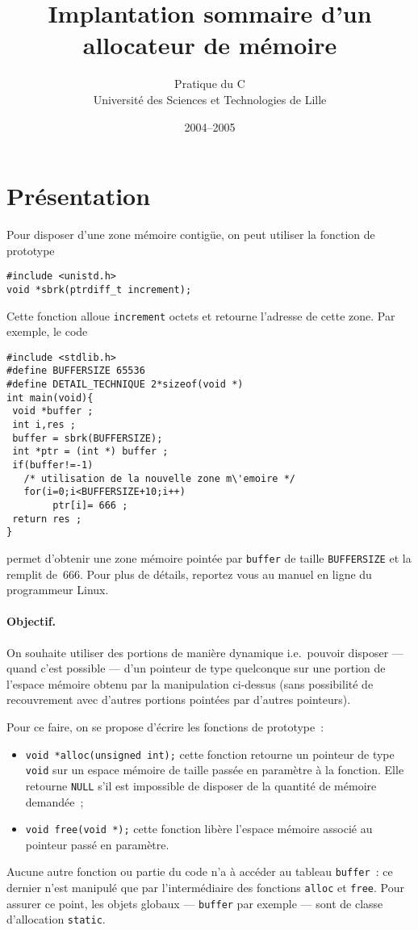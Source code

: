 \documentclass[a4paper]{article}
\title{Implantation sommaire d'un allocateur de m\'emoire}
\author{Pratique du C  \\
Universit\'e des Sciences et Technologies de Lille}
\date{2004--2005}
\begin{document}
\maketitle
\section{Pr\'esentation}
Pour disposer d'une zone m\'emoire contig\"ue, on peut utiliser la fonction de prototype
\begin{verbatim}
#include <unistd.h>
void *sbrk(ptrdiff_t increment);
\end{verbatim}
Cette fonction alloue \texttt{increment} octets et retourne l'adresse
de cette zone. Par exemple, le code
\begin{verbatim}
#include <stdlib.h>
#define BUFFERSIZE 65536
#define DETAIL_TECHNIQUE 2*sizeof(void *)
int main(void){
 void *buffer ;
 int i,res ;
 buffer = sbrk(BUFFERSIZE);
 int *ptr = (int *) buffer ;
 if(buffer!=-1)
   /* utilisation de la nouvelle zone m\'emoire */
   for(i=0;i<BUFFERSIZE+10;i++)
        ptr[i]= 666 ;
 return res ;
}
\end{verbatim}
permet d'obtenir une zone m\'emoire point\'ee par \texttt{buffer} de
taille \texttt{BUFFERSIZE} et la remplit de~$666$.  Pour plus de
d\'etails, reportez vous au manuel en ligne du programmeur Linux.
\paragraph{Objectif.}
On souhaite utiliser des portions de mani\`ere dynamique i.e.\ pouvoir
disposer --- quand c'est possible --- d'un pointeur de type quelconque
sur une portion de l'espace m\'emoire obtenu par la manipulation
ci-dessus (sans possibilit\'e de recouvrement avec d'autres portions
point\'ees par d'autres pointeurs).

Pour ce faire, on se propose d'\'ecrire les fonctions de prototype~:
\begin{itemize}
\item \verb+void *alloc(unsigned int);+ cette fonction retourne un
  pointeur de type \verb+void+ sur un espace m\'emoire de taille
  pass\'ee en param\`etre \`a la fonction. Elle retourne \verb+NULL+
  s'il est impossible de disposer de la quantit\'e de m\'emoire
  demand\'ee~;
\item \verb+void free(void *);+ cette fonction lib\`ere l'espace
  m\'emoire associ\'e au pointeur pass\'e en param\`etre.
\end{itemize}
Aucune autre fonction ou partie du code n'a \`a acc\'eder au tableau
\verb+buffer+~: ce dernier n'est manipul\'e que par l'interm\'ediaire
des fonctions \verb+alloc+ et \verb+free+. Pour assurer ce point, les
objets globaux --- \verb+buffer+ par exemple --- sont de classe
d'allocation \verb+static+.
\end{document}
